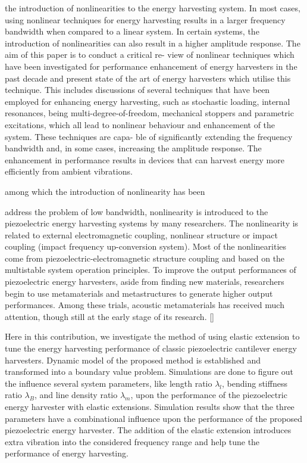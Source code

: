 \documentclass{elsarticle}
\begin{document}
the introduction of nonlinearities to the energy harvesting system. In most cases, using
nonlinear techniques for energy harvesting results in a larger frequency bandwidth when
compared to a linear system. In certain systems, the introduction of nonlinearities can also
result in a higher amplitude response. The aim of this paper is to conduct a critical re-
view of nonlinear techniques which have been investigated for performance enhancement
of energy harvesters in the past decade and present state of the art of energy harvesters
which utilise this technique. This includes discussions of several techniques that have been
employed for enhancing energy harvesting, such as stochastic loading, internal resonances,
being multi-degree-of-freedom, mechanical stoppers and parametric excitations, which all
lead to nonlinear behaviour and enhancement of the system. These techniques are capa-
ble of significantly extending the frequency bandwidth and, in some cases, increasing the
amplitude response. The enhancement in performance results in devices that can harvest
energy more efficiently from ambient vibrations.



 among which the introduction of nonlinearity has been


address the problem of low bandwidth, nonlinearity is introduced to the piezoelectric energy harvesting systems by many researchers. The nonlinearity is related to external electromagnetic coupling, nonlinear structure or impact coupling (impact frequency up-conversion system). Most of the nonlinearities come from piezoelectric-electromagnetic structure coupling and based on the  multistable system operation principles. To improve the output performances of piezoelectric energy harvesters, aside from finding new materials, researchers begin to use metamaterials and metastructures to generate higher output performances. Among these trials, acoustic metamaterials has received much attention, though still at the early stage of its research. []


Here in this contribution, we investigate the method of using elastic extension to tune the energy harvesting performance of classic piezoelectric cantilever energy harvesters. Dynamic model of the proposed method is established and transformed into a boundary value problem. Simulations are done to figure out the influence several system parameters, like length ratio $\lambda_l$, bending stiffness ratio $\lambda_B$, and line density ratio $\lambda_m$, upon the performance of the piezoelectric energy harvester with elastic extensions. Simulation results show that the three parameters have a combinational influence upon the performance of the proposed piezoelectric energy harvester. The addition of the elastic extension introduces extra vibration into the considered frequency range and help tune the performance of energy harvesting. 
\end{document}
